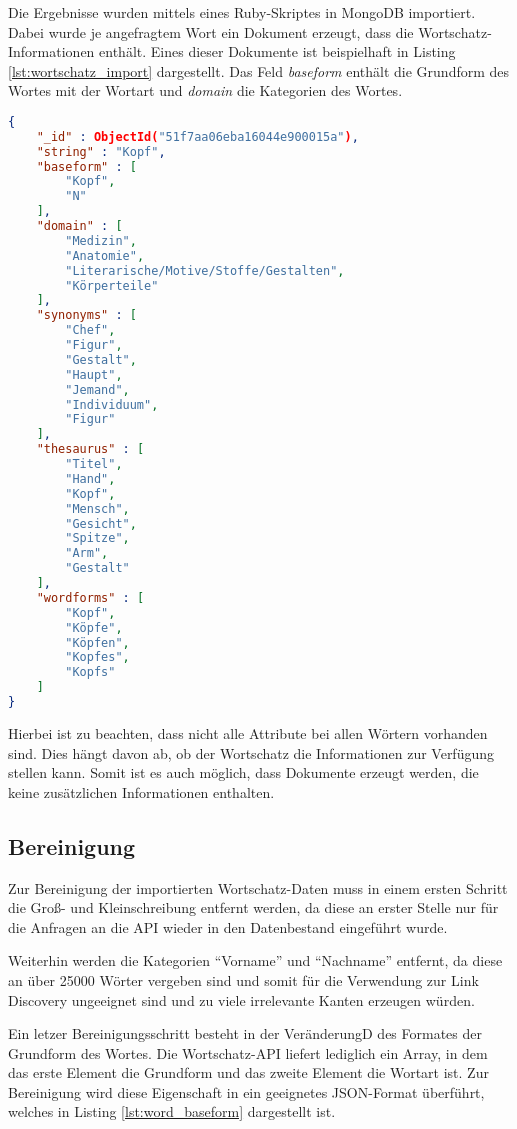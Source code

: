 Die Ergebnisse wurden mittels eines Ruby-Skriptes in MongoDB importiert. Dabei wurde je angefragtem Wort ein Dokument erzeugt, dass die Wortschatz-Informationen enthält. Eines dieser Dokumente ist beispielhaft in Listing \ref{lst:wortschatz_import} dargestellt. Das Feld \emph{baseform} enthält die Grundform des Wortes mit der Wortart und \emph{domain} die Kategorien des Wortes.

\begin{lstlisting}[language=json, label={lst:wortschatz_import}, caption={Wortschatz-Dokument nach dem Import}]
{
    "_id" : ObjectId("51f7aa06eba16044e900015a"),
    "string" : "Kopf",
    "baseform" : [ 
        "Kopf", 
        "N"
    ],
    "domain" : [ 
        "Medizin", 
        "Anatomie", 
        "Literarische/Motive/Stoffe/Gestalten", 
        "Körperteile"
    ],
    "synonyms" : [  
        "Chef", 
        "Figur", 
        "Gestalt", 
        "Haupt", 
        "Jemand", 
        "Individuum", 
        "Figur"
    ],
    "thesaurus" : [ 
        "Titel", 
        "Hand", 
        "Kopf", 
        "Mensch", 
        "Gesicht", 
        "Spitze", 
        "Arm", 
        "Gestalt"
    ],
    "wordforms" : [ 
        "Kopf", 
        "Köpfe", 
        "Köpfen", 
        "Kopfes", 
        "Kopfs"
    ]
}
\end{lstlisting}

Hierbei ist zu beachten, dass nicht alle Attribute bei allen Wörtern vorhanden sind. Dies hängt davon ab, ob der Wortschatz die Informationen zur Verfügung stellen kann. Somit ist es auch möglich, dass Dokumente erzeugt werden, die keine zusätzlichen Informationen enthalten.

\subsection{Bereinigung}

Zur Bereinigung der importierten Wortschatz-Daten muss in einem ersten Schritt die Groß- und Kleinschreibung entfernt werden, da diese an erster Stelle nur für die Anfragen an die API wieder in den Datenbestand eingeführt wurde.

Weiterhin werden die Kategorien ``Vorname'' und ``Nachname'' entfernt, da diese an über \num{25000} Wörter vergeben sind und somit für die Verwendung zur Link Discovery ungeeignet sind und zu viele irrelevante Kanten erzeugen würden.

Ein letzer Bereinigungsschritt besteht in der VeränderungD des Formates der Grundform des Wortes. Die Wortschatz-API liefert lediglich ein Array, in dem das erste Element die Grundform und das zweite Element die Wortart ist. Zur Bereinigung wird diese Eigenschaft in ein geeignetes JSON-Format überführt, welches in Listing \ref{lst:word_baseform} dargestellt ist.

